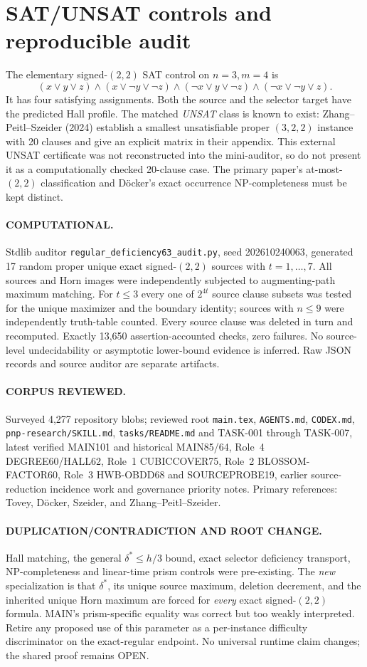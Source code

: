 \documentclass[11pt]{article}
\begin{document}
\section{SAT/UNSAT controls and reproducible audit}
The elementary signed-$(2,2)$ SAT control on $n=3,m=4$ is
\[
(x\vee y\vee z)\wedge(x\vee\neg y\vee\neg z)
\wedge(\neg x\vee y\vee\neg z)
\wedge(\neg x\vee\neg y\vee z).
\]
It has four satisfying assignments. Both the source and the selector target have the predicted Hall profile. The matched \emph{UNSAT} class is known to exist: Zhang--Peitl--Szeider (2024) establish a smallest unsatisfiable proper $(3,2,2)$ instance with 20 clauses and give an explicit matrix in their appendix. This external UNSAT certificate was not reconstructed into the mini-auditor, so do not present it as a computationally checked 20-clause case. The primary paper's at-most-$(2,2)$ classification and D\"ocker's exact occurrence NP-completeness must be kept distinct.
\paragraph{COMPUTATIONAL.}
Stdlib auditor \texttt{regular\_deficiency63\_audit.py}, seed 202610240063, generated 17 random proper unique exact signed-$(2,2)$ sources with $t=1,\ldots,7$. All sources and Horn images were independently subjected to augmenting-path maximum matching. For $t\le3$ every one of $2^{4t}$ source clause subsets was tested for the unique maximizer and the boundary identity; sources with $n\le9$ were independently truth-table counted. Every source clause was deleted in turn and recomputed. Exactly 13,650 assertion-accounted checks, zero failures. No source-level undecidability or asymptotic lower-bound evidence is inferred. Raw JSON records and source auditor are separate artifacts.
\paragraph{CORPUS REVIEWED.}
Surveyed 4,277 repository blobs; reviewed root \texttt{main.tex}, \texttt{AGENTS.md}, \texttt{CODEX.md}, \texttt{pnp-research/SKILL.md}, \texttt{tasks/README.md} and TASK-001 through TASK-007, latest verified MAIN101 and historical MAIN85/64, Role~4 DEGREE60/HALL62, Role~1 CUBICCOVER75, Role~2 BLOSSOM-FACTOR60, Role~3 HWB-OBDD68 and SOURCEPROBE19, earlier source-reduction incidence work and governance priority notes. Primary references: Tovey, D\"ocker, Szeider, and Zhang--Peitl--Szeider.
\paragraph{DUPLICATION/CONTRADICTION AND ROOT CHANGE.}
Hall matching, the general $\delta^*\le h/3$ bound, exact selector deficiency transport, NP-completeness and linear-time prism controls were pre-existing. The \emph{new} specialization is that $\delta^*$, its unique source maximum, deletion decrement, and the inherited unique Horn maximum are forced for \emph{every} exact signed-$(2,2)$ formula. MAIN's prism-specific equality was correct but too weakly interpreted. Retire any proposed use of this parameter as a per-instance difficulty discriminator on the exact-regular endpoint. No universal runtime claim changes; the shared proof remains OPEN.
\end{document}
